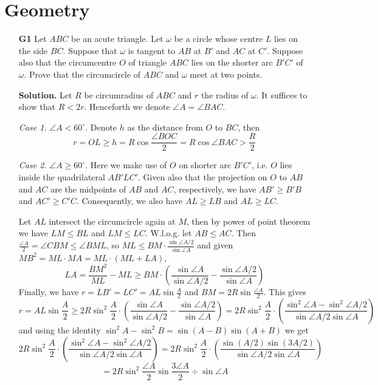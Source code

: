 \documentclass[11pt,a4paper]{article}
\begin{document}
\section*{Geometry}
\begin{enumerate}
	\item[\textbf{G1}]
	Let $ABC$ be an acute triangle. Let $\omega$ be a circle whose centre $L$ lies on the side $BC$. Suppose that $\omega$ is tangent to $AB$ at $B'$ and $AC$ at $C'$. Suppose also that the circumcentre $O$ of triangle $ABC$ lies on the shorter arc $B'C'$ of $\omega$. Prove that the circumcircle of $ABC$ and $\omega$ meet at two points.
	
	\textbf{Solution.} 
	Let $R$ be circumradius of $ABC$ and $r$ the radius of $\omega$. It suffices to show that $R<2r$. 
	Henceforth we denote $\angle A = \angle BAC$. 
	
	\emph{Case 1.} 
	$\angle A < 60^{\circ}$. 
	Denote $h$ as the distance from $O$ to $BC$, then 
	\[
	r = OL \ge h = R\cos\frac{\angle BOC}{2} = R\cos\angle BAC > \frac{R}{2}
	\]
	
	\emph{Case 2.} 
	$\angle A \ge 60^{\circ}$. 
	Here we make use of $O$ on shorter arc $B'C'$, i.e. $O$ lies inside the quadrilateral $AB'LC'$. 
	Given also that the projection on $O$ to $AB$ and $AC$ are the midpoints of $AB$ and $AC$, respectively, 
	we have $AB'\ge B'B$ and $AC'\ge C'C$. 
	Consequently, we also have $AL\ge LB$ and $AL\ge LC$. 
	
	Let $AL$ intersect the circumcircle again at $M$, 
	then by power of point theorem we have $LM\le BL$ and $LM\le LC$. 
	W.l.o.g. let $AB\le AC$. 
	Then $\frac{\angle A}{2}=\angle CBM\le \angle BML$, 
	so $ML\le BM\cdot \frac{\sin \angle A/2}{\sin\angle A}$
	and given $MB^2 = ML\cdot MA=ML\cdot (ML+LA)$, 
	\[
	LA =\frac{BM^2}{ML}-ML \ge BM\cdot (\frac{\sin\angle A}{\sin \angle A/2} - \frac{\sin \angle A/2}{\sin\angle A})
	\]
	Finally, we have $r =LB'=LC'= AL\sin\frac{A}{2}$ and $BM=2R\sin \frac{\angle A}{2}$. 
	This gives 
	\[
	r = AL\sin\frac{A}{2}
	\ge 2R\sin^2\frac{A}{2}\cdot (\frac{\sin\angle A}{\sin \angle A/2} - \frac{\sin \angle A/2}{\sin\angle A})
	= 
	2R\sin^2\frac{A}{2}\cdot (\frac{\sin^2\angle A - \sin^2\angle A/2}{\sin \angle A/2\sin\angle A})
	\]
	and using the identity 
	$\sin^2 A - \sin^2 B = \sin(A-B)\sin(A+B)$
	 we get 
	\[
	2R\sin^2\frac{A}{2}\cdot (\frac{\sin^2\angle A - \sin^2\angle A/2}{\sin \angle A/2\sin\angle A})
	= 2R\sin^2\frac{A}{2}\cdot (\frac{\sin(A/2)\sin (3A/2)}{\sin \angle A/2\sin\angle A})
	\]
	\[
	=2R\sin^2 \frac{\angle A}{2}\sin\frac{3\angle A}{2}\div \sin\angle A
	\]
	

\end{enumerate}
\end{document}
